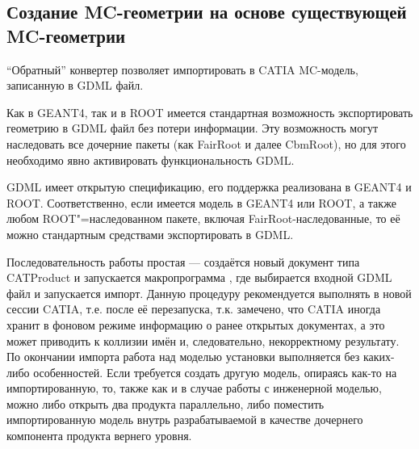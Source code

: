 %                                                    

\subsection[Создание MC-геометрии на основе существующей MC-геометрии]{Создание MC-геометрии на основе существующей\\ MC-геометрии}\label{sec:secMCtoCAD}

``Обратный'' конвертер  позволяет импортировать в CATIA MC-модель, записанную в GDML файл.

Как в GEANT4, так и в ROOT имеется стандартная возможность экспортировать геометрию в GDML файл без потери информации. Эту возможность могут наследовать все дочерние пакеты (как FairRoot и далее CbmRoot), но для этого необходимо явно активировать функциональность GDML. 

GDML имеет открытую спецификацию, его поддержка реализована в GEANT4 и ROOT. Соответственно, если имеется модель в GEANT4 или ROOT, а также любом ROOT"=наследованном пакете, включая FairRoot-наследованные, то её можно стандартным средствами экспортировать в GDML.

Последовательность работы простая --- создаётся новый документ типа CATProduct и запускается макропрограмма , где выбирается входной GDML файл и запускается импорт. Данную процедуру рекомендуется выполнять в новой сессии CATIA, т.е. после её перезапуска, т.к. замечено, что CATIA иногда хранит в фоновом режиме информацию о ранее открытых документах, а это может приводить к коллизии имён и, следовательно, некорректному результату. По окончании импорта работа над моделью установки выполняется без каких-либо особенностей. Если требуется создать другую модель, опираясь как-то на импортированную, то, также как и в случае работы с инженерной моделью, можно либо открыть два продукта параллельно, либо поместить импортированную модель внутрь разрабатываемой в качестве дочернего компонента продукта вернего уровня.
